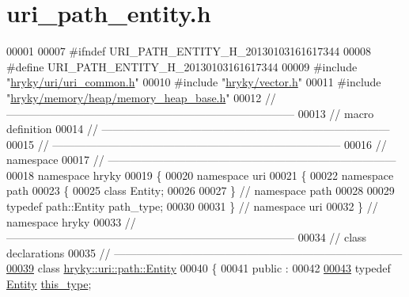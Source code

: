 \hypertarget{uri__path__entity_8h_source}{\section{uri\-\_\-path\-\_\-entity.\-h}
}

\begin{DoxyCode}
00001 
00007 \textcolor{preprocessor}{#ifndef URI\_PATH\_ENTITY\_H\_20130103161617344}
00008 \textcolor{preprocessor}{}\textcolor{preprocessor}{#define URI\_PATH\_ENTITY\_H\_20130103161617344}
00009 \textcolor{preprocessor}{}\textcolor{preprocessor}{#include "\hyperlink{uri__common_8h}{hryky/uri/uri_common.h}"}
00010 \textcolor{preprocessor}{#include "\hyperlink{vector_8h}{hryky/vector.h}"}
00011 \textcolor{preprocessor}{#include "\hyperlink{memory__heap__base_8h}{hryky/memory/heap/memory_heap_base.h}"}
00012 \textcolor{comment}{//
      ------------------------------------------------------------------------------}
00013 \textcolor{comment}{// macro definition}
00014 \textcolor{comment}{//
      ------------------------------------------------------------------------------}
00015 \textcolor{comment}{//
      ------------------------------------------------------------------------------}
00016 \textcolor{comment}{// namespace}
00017 \textcolor{comment}{//
      ------------------------------------------------------------------------------}
00018 \textcolor{keyword}{namespace }hryky
00019 \{
00020 \textcolor{keyword}{namespace }uri
00021 \{
00022 \textcolor{keyword}{namespace }path
00023 \{
00025     \textcolor{keyword}{class }Entity;
00026 
00027 \} \textcolor{comment}{// namespace path}
00028 
00029 \textcolor{keyword}{typedef} path::Entity path\_type;
00030 
00031 \} \textcolor{comment}{// namespace uri}
00032 \} \textcolor{comment}{// namespace hryky}
00033 \textcolor{comment}{//
      ------------------------------------------------------------------------------}
00034 \textcolor{comment}{// class declarations}
00035 \textcolor{comment}{//
      ------------------------------------------------------------------------------}
\hypertarget{uri__path__entity_8h_source_l00039}{}\hyperlink{classhryky_1_1uri_1_1path_1_1_entity}{00039} \textcolor{comment}{}\textcolor{keyword}{class }\hyperlink{classhryky_1_1uri_1_1path_1_1_entity}{hryky::uri::path::Entity}
00040 \{
00041 \textcolor{keyword}{public} :
00042 
\hypertarget{uri__path__entity_8h_source_l00043}{}\hyperlink{classhryky_1_1uri_1_1path_1_1_entity_ab451cbde937d2551ecd5c3360cb58100}{00043}     \textcolor{keyword}{typedef} \hyperlink{classhryky_1_1uri_1_1path_1_1_entity}{Entity} \hyperlink{classhryky_1_1uri_1_1path_1_1_entity_ab451cbde937d2551ecd5c3360cb58100}{this_type};

\end{DoxyCode}
